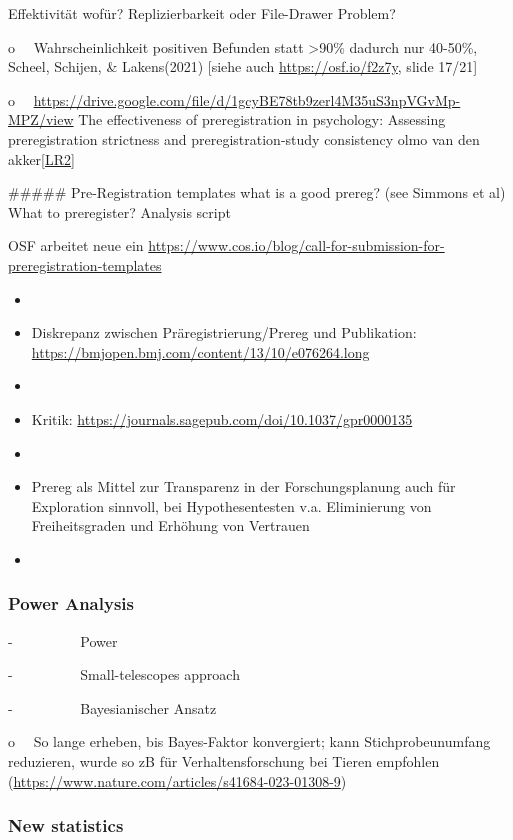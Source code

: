 \documentclass[
  letterpaper,
  DIV=11,
  numbers=noendperiod]{scrreprt}
\begin{document}
Effektivität wofür? Replizierbarkeit oder File-Drawer Problem?

o~~ Wahrscheinlichkeit positiven Befunden statt \textgreater90\% dadurch
nur 40-50\%, Scheel, Schijen, \& Lakens(2021) {[}siehe auch
\url{https://osf.io/f2z7y}, slide 17/21{]}

o~~
\url{https://drive.google.com/file/d/1gcyBE78tb9zerl4M35uS3npVGvMp-MPZ/view}
The effectiveness of preregistration in psychology: Assessing
preregistration strictness and preregistration-study consistency olmo
van den akker\hyperref[_msocom_2]{{[}LR2{]}}~

\#\#\#\#\# Pre-Registration templates what is a good prereg? (see
Simmons et al) What to preregister? Analysis script

OSF arbeitet neue ein
\url{https://www.cos.io/blog/call-for-submission-for-preregistration-templates}

\begin{itemize}
\item
\item
  Diskrepanz zwischen Präregistrierung/Prereg und Publikation:
  \url{https://bmjopen.bmj.com/content/13/10/e076264.long}
\item
\item
  Kritik: \url{https://journals.sagepub.com/doi/10.1037/gpr0000135}
\item
\item
  Prereg als Mittel zur Transparenz in der Forschungsplanung auch für
  Exploration sinnvoll, bei Hypothesentesten v.a. Eliminierung von
  Freiheitsgraden und Erhöhung von Vertrauen
\item
\end{itemize}

\subsubsection{Power Analysis}\label{power-analysis}

-~~~~~~~~~ Power

-~~~~~~~~~ Small-telescopes approach

-~~~~~~~~~ Bayesianischer Ansatz

o~~ So lange erheben, bis Bayes-Faktor konvergiert; kann
Stichprobeunumfang reduzieren, wurde so zB für Verhaltensforschung bei
Tieren empfohlen
(\url{https://www.nature.com/articles/s41684-023-01308-9})

\subsubsection{New statistics}\label{new-statistics}
\end{document}
